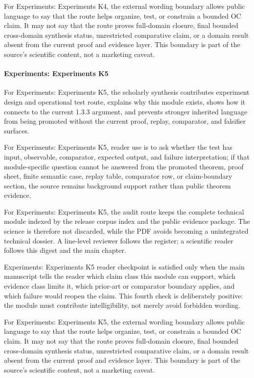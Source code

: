 For Experiments: Experiments K4, the external wording boundary allows public language to say that the route helps organize, test, or constrain a bounded OC claim. It may not say that the route proves full-domain closure, final bounded cross-domain synthesis status, unrestricted comparative claim, or a domain result absent from the current proof and evidence layer. This boundary is part of the source's scientific content, not a marketing caveat.


\paragraph{Experiments: Experiments K5}

For Experiments: Experiments K5, the scholarly synthesis contributes experiment design and operational test route, explains why this module exists, shows how it connects to the current 1.3.3 argument, and prevents stronger inherited language from being promoted without the current proof, replay, comparator, and falsifier surfaces.


For Experiments: Experiments K5, reader use is to ask whether the test has input, observable, comparator, expected output, and failure interpretation; if that module-specific question cannot be answered from the promoted theorem, proof sheet, finite semantic case, replay table, comparator row, or claim-boundary section, the source remains background support rather than public theorem evidence.


For Experiments: Experiments K5, the audit route keeps the complete technical module indexed by the release corpus index and the public evidence package. The science is therefore not discarded, while the PDF avoids becoming a unintegrated technical dossier. A line-level reviewer follows the register; a scientific reader follows this digest and the main chapter.


Experiments: Experiments K5 reader checkpoint is satisfied only when the main manuscript tells the reader which claim class this module can support, which evidence class limits it, which prior-art or comparator boundary applies, and which failure would reopen the claim. This fourth check is deliberately positive: the module must contribute intelligibility, not merely avoid forbidden wording.


For Experiments: Experiments K5, the external wording boundary allows public language to say that the route helps organize, test, or constrain a bounded OC claim. It may not say that the route proves full-domain closure, final bounded cross-domain synthesis status, unrestricted comparative claim, or a domain result absent from the current proof and evidence layer. This boundary is part of the source's scientific content, not a marketing caveat.


